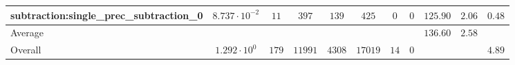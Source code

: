 \begin{tabular}{|l|c|c|c|c|c|c|c|c|c|c|}
subtraction:single\_prec\_subtraction\_0         & $ 8.737 \cdot 10^{-2} $ & $ 11     $ & $ 397   $ & $ 139  $ & $ 425   $ & $ 0  $ & $ 0 $ & $ 125.90      $ & $ 2.06    $ & $ 0.48    $ \\
\hline
Average                                          & $                     $ & $        $ & $       $ & $      $ & $       $ & $    $ & $   $ & $ 136.60      $ & $ 2.58    $ & $         $ \\
\hline
Overall                                          & $ 1.292 \cdot 10^{0}  $ & $ 179    $ & $ 11991 $ & $ 4308 $ & $ 17019 $ & $ 14 $ & $ 0 $ & $             $ & $         $ & $ 4.89    $ \\
\hline
\end{tabular}
